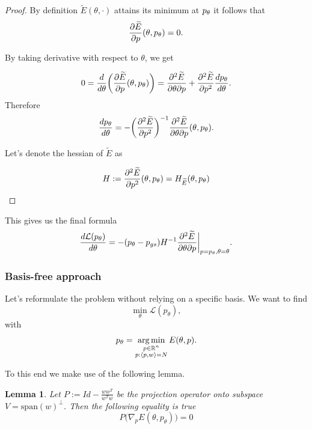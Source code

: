 \documentclass[a4paper,10pt]{report}
\newtheorem{lemma}{Lemma}
\begin{document}
\begin{proof}
By definition $\widetilde{E}(\theta, \cdot)$ attains its minimum at $p_\theta$ it follows that
\begin{equation}
\frac{\partial \widetilde{E}}{\partial p}(\theta, p_\theta) = 0.
\end{equation}

By taking derivative with respect to $\theta$, we get

\begin{equation}
0=\frac{d}{d \theta}\bigg(\frac{\partial \widetilde{E}}{\partial p}(\theta, p_\theta)\bigg) = \frac{\partial^2 \widetilde{E}}{\partial \theta \partial p} + \frac{\partial^2 \widetilde{E}}{\partial p^2} \frac{dp_\theta}{d \theta}.
\end{equation}
Therefore
\begin{equation}
 \frac{dp_\theta}{d \theta} = -\bigg(\frac{\partial^2 \widetilde{E}}{\partial p^2}\bigg)^{-1} \frac{\partial^2 \widetilde{E}}{\partial \theta \partial p}(\theta, p_\theta).
\end{equation}

Let's denote the hessian of $\widetilde{E}$ as

\begin{equation}
 H := \frac{\partial^2 \widetilde{E}}{\partial p^2}(\theta,p_\theta) = H_{\widetilde{E}}(\theta,p_\theta)
\end{equation}
\end{proof}
This gives us the final formula
\begin{equation}
 \frac{d\mathcal{L}(p_\theta)}{d \theta} = - (p_\theta - p_{gs}) H^{-1}  \frac{\partial^2 \widetilde{E}}{\partial \theta \partial p}\bigg|_{p=p_\theta, \theta=\theta}.
\end{equation}


\subsubsection{Basis-free approach}
Let's reformulate the problem without relying on a specific basis.
We want to find
\begin{equation}
 \min_\theta \mathcal{L}(p_\theta),
\end{equation}
with
\begin{equation}
p_\theta = \operatorname*{arg\,min}_{\substack{p \in \mathbb{R}^n \\ p: \langle p, w \rangle=N }} E(\theta, p).
\end{equation}


 To this end we make use of the following lemma.

\begin{lemma}
 Let $P := Id -\frac{ww^T}{w^Tw} $ be the projection operator onto subspace $V = \text{span}(w)^{\perp}$. Then the following equality is true
 \begin{equation}
  P\big(\nabla_p E(\theta, p_\theta)\big) = 0
 \end{equation}

\end{lemma}
\end{document}
